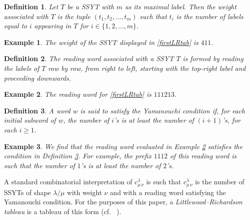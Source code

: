 \documentclass[12pt]{article}
\newtheorem{definition}{Definition}
\newtheorem{example}{Example}
\begin{document}
\begin{definition}
 Let $T$ be a SSYT with $m$ as its maximal label. Then the \emph{weight} associated with $T$ is the tuple $(t_1, t_2, \ldots, t_m)$ such 
 that $t_i$ is the number of labels equal to $i$ appearing in $T$ for $i \in \{ 1, 2, \ldots, m \}$. 
\end{definition}

\begin{example}
 The weight of the SSYT displayed in \eqref{firstLRtab} is $411$. 
\end{example}

\begin{definition}
 The \emph{reading word} associated with a SSYT $T$ is formed by reading the labels of $T$ row by row, from right to left, starting with 
 the top-right label and proceeding downwards. 
\end{definition}

\begin{example}\label{exreadword}
 The reading word for \eqref{firstLRtab} is $111213$.
 \end{example}

\begin{definition}\label{defineYama}
 A word $w$ is said to satisfy the \emph{Yamanouchi condition} if, for each initial subword of $w$, 
 the number of $i$'s is at least the number of $(i+1)$'s, for each $i \geq 1$.
\end{definition}

\begin{example}
 We find that the reading word evaluated in Example \ref{exreadword} satisfies the condition in Definition \ref{defineYama}. For example, 
 the prefix $1112$ of this reading word is such that the number of $1$'s is at least the number of $2$'s. 
\end{example}

 A standard combinatorial interpretation of $c_{\mu \, \nu}^{\lambda}$ is such that $ c_{\mu \, \nu}^{\lambda}$ is the number of SSYTs 
 of shape $\lambda / \mu$ with weight $\nu$ and with a reading word satisfying the Yamanouchi condition. For the purposes of this 
 paper, a \emph{Littlewood--Richardson tableau} is a tableau of this form (cf.\ 
 \cite[p.\ 143]{Macdonald1995} \cite[p.\ 177]{Sagan2001}). 
\end{document}
